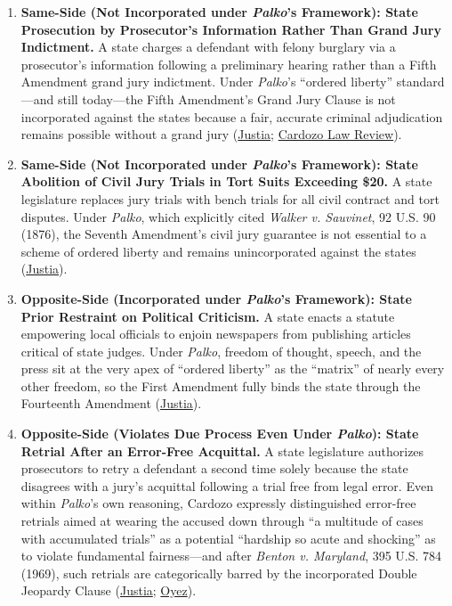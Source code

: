\documentclass[12pt]{article}
\begin{document}
\begin{enumerate}
    \item \textbf{Same-Side (Not Incorporated under \textit{Palko}'s Framework): State Prosecution by Prosecutor's Information Rather Than Grand Jury Indictment.} A state charges a defendant with felony burglary via a prosecutor's information following a preliminary hearing rather than a Fifth Amendment grand jury indictment. Under \textit{Palko}'s ``ordered liberty'' standard---and still today---the Fifth Amendment's Grand Jury Clause is not incorporated against the states because a fair, accurate criminal adjudication remains possible without a grand jury (\href{https://supreme.justia.com/cases/federal/us/302/319/}{Justia}; \href{https://www.cardozolawreview.com/interrogating-the-nonincorporation-of-the-grand-jury-clause/}{Cardozo Law Review}).

    \item \textbf{Same-Side (Not Incorporated under \textit{Palko}'s Framework): State Abolition of Civil Jury Trials in Tort Suits Exceeding \$20.} A state legislature replaces jury trials with bench trials for all civil contract and tort disputes. Under \textit{Palko}, which explicitly cited \textit{Walker v. Sauvinet}, 92 U.S. 90 (1876), the Seventh Amendment's civil jury guarantee is not essential to a scheme of ordered liberty and remains unincorporated against the states (\href{https://supreme.justia.com/cases/federal/us/302/319/}{Justia}).

    \item \textbf{Opposite-Side (Incorporated under \textit{Palko}'s Framework): State Prior Restraint on Political Criticism.} A state enacts a statute empowering local officials to enjoin newspapers from publishing articles critical of state judges. Under \textit{Palko}, freedom of thought, speech, and the press sit at the very apex of ``ordered liberty'' as the ``matrix'' of nearly every other freedom, so the First Amendment fully binds the state through the Fourteenth Amendment (\href{https://supreme.justia.com/cases/federal/us/302/319/}{Justia}).

    \item \textbf{Opposite-Side (Violates Due Process Even Under \textit{Palko}): State Retrial After an Error-Free Acquittal.} A state legislature authorizes prosecutors to retry a defendant a second time solely because the state disagrees with a jury's acquittal following a trial free from legal error. Even within \textit{Palko}'s own reasoning, Cardozo expressly distinguished error-free retrials aimed at wearing the accused down through ``a multitude of cases with accumulated trials'' as a potential ``hardship so acute and shocking'' as to violate fundamental fairness---and after \textit{Benton v. Maryland}, 395 U.S. 784 (1969), such retrials are categorically barred by the incorporated Double Jeopardy Clause (\href{https://supreme.justia.com/cases/federal/us/302/319/}{Justia}; \href{https://www.oyez.org/cases/1900-1940/302us319}{Oyez}).


\end{enumerate}
\end{document}
